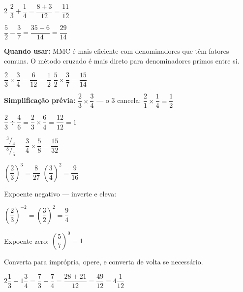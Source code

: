 \documentclass[12pt,twoside]{article}
\begin{document}
\begin{multicols}{2}
$\dfrac{2}{3} + \dfrac{1}{4} = \dfrac{8+3}{12} = \dfrac{11}{12}$ \checkmark

$\dfrac{5}{2} - \dfrac{3}{7} = \dfrac{35-6}{14} = \dfrac{29}{14}$ \checkmark

\textbf{Quando usar:} MMC é mais eficiente com denominadores que têm fatores comuns. O método cruzado é mais direto para denominadores primos entre si.




$\dfrac{2}{3} \times \dfrac{3}{4} = \dfrac{6}{12} = \dfrac{1}{2}$ \qquad $\dfrac{5}{2} \times \dfrac{3}{7} = \dfrac{15}{14}$

\textbf{Simplificação prévia:} $\dfrac{2}{3}\times\dfrac{3}{4}$ — o 3 cancela: $\dfrac{2}{1}\times\dfrac{1}{4} = \dfrac{1}{2}$



$\dfrac{2}{3} \div \dfrac{4}{6} = \dfrac{2}{3} \times \dfrac{6}{4} = \dfrac{12}{12} = 1$ \checkmark

$\dfrac{\;^3\!/_4}{\;^8\!/_5} = \dfrac{3}{4} \times \dfrac{5}{8} = \dfrac{15}{32}$ \checkmark



$\left(\dfrac{2}{3}\right)^3 = \dfrac{8}{27}$ \qquad $\left(\dfrac{3}{4}\right)^2 = \dfrac{9}{16}$

Expoente negativo — inverte e eleva:

$\left(\dfrac{2}{3}\right)^{-2} = \left(\dfrac{3}{2}\right)^2 = \dfrac{9}{4}$

Expoente zero: $\left(\dfrac{5}{7}\right)^0 = 1$


Converta para imprópria, opere, e converta de volta se necessário.


$2\dfrac{1}{3} + 1\dfrac{3}{4} = \dfrac{7}{3} + \dfrac{7}{4} = \dfrac{28+21}{12} = \dfrac{49}{12} = 4\dfrac{1}{12}$ \checkmark



\end{multicols}
\end{document}

